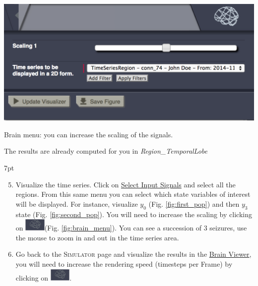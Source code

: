 \documentclass{tufte-handout}
\newenvironment{simulation}{%
  \def\FrameCommand{%
    \hspace{1pt}%
    {\color{ForestGreen}\vrule width 2pt}%
    {\color{simulationshade}\vrule width 4pt}%
    \colorbox{simulationshade}%
  }%
  \MakeFramed{\advance\hsize-\width\FrameRestore}%
  \noindent\hspace{-4.55pt}%
  \begin{adjustwidth}{}{7pt}%
  \vspace{2pt}\vspace{2pt}%
}
{%
  \vspace{2pt}\end{adjustwidth}\endMakeFramed%
}
\begin{document}
\begin{marginfigure}
  \includegraphics[width=\linewidth]{Handout_UI_ModellingEpilepsy_BrainMenuScaling}%
  \caption{Brain menu: you can increase the scaling of the signals.}%
  \label{fig:brain_menu}%
\end{marginfigure}

The results are already computed for you in \textit{Region\_TemporalLobe}


\begin{simulation}
  \begin{enumerate}
  \setcounter{enumi}{4}
  \item Visualize the time series. Click on \underline{Select Input Signals} and select all the regions. 
  From this same menu you can select which state variables of interest will be displayed. For instance, visualize 
  $y_0$ (Fig. \ref{fig:first_pop}) and then $y_3$ state (Fig. \ref{fig:second_pop}). 
	You will need to increase the scaling by clicking on \includegraphics[width=0.08\textwidth]{butt_brain_menu}(Fig. \ref{fig:brain_menu}). You can see a succession of 3 seizures, use the mouse
	 to zoom in and out in the time series area.
  \item Go back to the \textsc{Simulator} page and visualize the results in the \underline{Brain Viewer}, you will need to increase the rendering speed 
	(timesteps per Frame) by clicking on \includegraphics[width=0.08\textwidth]{butt_brain_menu}.
\end{enumerate}
\end{simulation}
  
\end{document}
